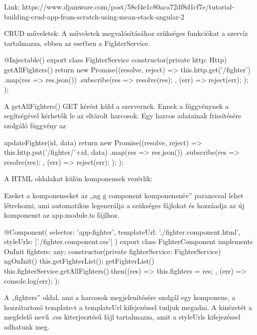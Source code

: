 
Link: https://www.djamware.com/post/58cf4e1c80aca72df8d1cf7e/tutorial-building-crud-app-from-scratch-using-mean-stack-angular-2

CRUD műveletek: A műveletek megvalósításához szükséges funkciókat a szervíz tartalmazza, ebben az esetben a FighterService.

\begin{cpp}
@Injectable()
export class FighterService {
  constructor(private http: Http) { }
  getAllFighters() {
    return new Promise((resolve, reject) => {
      this.http.get('/fighter')
        .map(res => res.json())
        .subscribe(res => {
          resolve(res);
        }, (err) => {
          reject(err);
        });
    });  }  }
\end{cpp}

A getAllFighters() GET kérést küld a szervernek. Ennek a függvénynek a segítségével kérhetők le az eltárolt harcosok.
Egy harcos adatainak frissítésére szolgáló függvény az 

\begin{cpp}
updateFighter(id, data) {
    return new Promise((resolve, reject) => {
        this.http.put('/fighter/'+id, data)
          .map(res => res.json())
          .subscribe(res => {
            resolve(res);
          }, (err) => {
            reject(err);
          });
    });
  }
\end{cpp}

A HTML oldalakat külön komponensek vezérlik:

Ezeket a komponenseket az „ng g component komponensnév” paranccsal lehet létrehozni, ami automatikus legenerálja a szükséges fájlokat és hozzáadja az új komponenst az app.module.ts fájlhoz.

\begin{cpp}
@Component({
  selector: 'app-fighter',
  templateUrl: './fighter.component.html',
  styleUrls: ['./fighter.component.css']
})
export class FighterComponent implements OnInit {
  fighters: any;
  constructor(private fighterService: FighterService) { }
  ngOnInit() {
    this.getFighterList();
  }
  getFighterList() {
    this.fighterService.getAllFighters().then((res) => {
      this.fighters = res;
    }, (err) => {
      console.log(err);
    });}}
\end{cpp}

A „fighters” oldal, ami a harcosok megjelenítésére szolgál egy komponens, a hozzátartozó template-t a templateUrl kifejezéssel tudjuk megadni. A kinézetét a megfelelő nevű .css kiterjesztésű fájl tartalmazza, amit a styleUrls kifejezéssel adhatunk meg.

